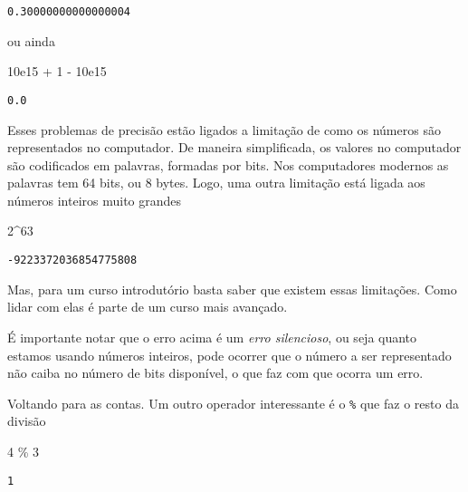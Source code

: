 \documentclass[
  letterpaper,
  DIV=11,
  numbers=noendperiod]{scrreprt}
\newenvironment{Shaded}{\begin{snugshade}}{\end{snugshade}}
\newcommand{\FloatTok}[1]{\textcolor[rgb]{0.68,0.00,0.00}{#1}}
\newcommand{\OperatorTok}[1]{\textcolor[rgb]{0.37,0.37,0.37}{#1}}
\begin{document}
\begin{verbatim}
0.30000000000000004
\end{verbatim}

ou ainda

\begin{Shaded}
\begin{Highlighting}[]
\FloatTok{10e15} \OperatorTok{+} \FloatTok{1} \OperatorTok{{-}} \FloatTok{10e15}
\end{Highlighting}
\end{Shaded}

\begin{verbatim}
0.0
\end{verbatim}

Esses problemas de precisão estão ligados a limitação de como os números
são representados no computador. De maneira simplificada, os valores no
computador são codificados em palavras, formadas por bits. Nos
computadores modernos as palavras tem 64 bits, ou 8 bytes. Logo, uma
outra limitação está ligada aos números inteiros muito grandes

\begin{Shaded}
\begin{Highlighting}[]
\FloatTok{2}\OperatorTok{\^{}}\FloatTok{63}
\end{Highlighting}
\end{Shaded}

\begin{verbatim}
-9223372036854775808
\end{verbatim}

Mas, para um curso introdutório basta saber que existem essas
limitações. Como lidar com elas é parte de um curso mais avançado.

É importante notar que o erro acima é um \emph{erro silencioso}, ou seja
quanto estamos usando números inteiros, pode ocorrer que o número a ser
representado não caiba no número de bits disponível, o que faz com que
ocorra um erro.

Voltando para as contas. Um outro operador interessante é o \texttt{\%}
que faz o resto da divisão

\begin{Shaded}
\begin{Highlighting}[]
\FloatTok{4} \OperatorTok{\%} \FloatTok{3}
\end{Highlighting}
\end{Shaded}

\begin{verbatim}
1
\end{verbatim}
\end{document}
